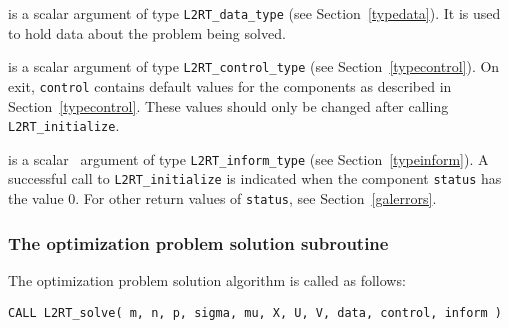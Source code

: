 \documentclass{galahad}
\newcommand{\packagename}{L2\-RT}
\begin{document}
\begin{description}

 is a scalar \intentinout argument of type 
{\tt \packagename\_data\_type}
(see Section~\ref{typedata}). It is used to hold data about the problem being 
solved. 

 is a scalar \intentout argument of type 
{\tt \packagename\_control\_type}
(see Section~\ref{typecontrol}). 
On exit, {\tt control} contains default values for the components as
described in Section~\ref{typecontrol}.
These values should only be changed after calling 
{\tt \packagename\_initialize}.

 is a scalar \intentout\ argument of type 
{\tt \packagename\_inform\_type}
(see Section~\ref{typeinform}). A successful call to
{\tt \packagename\_initialize}
is indicated when the  component {\tt status} has the value 0. 
For other return values of {\tt status}, see Section~\ref{galerrors}.

\end{description}


\subsubsection{The optimization problem solution subroutine}
The optimization problem solution algorithm is called as follows:

\hskip0.5in 
{\tt CALL \packagename\_solve( m, n, p, sigma, mu, X, U, V, data, control, inform )}
\end{document}
